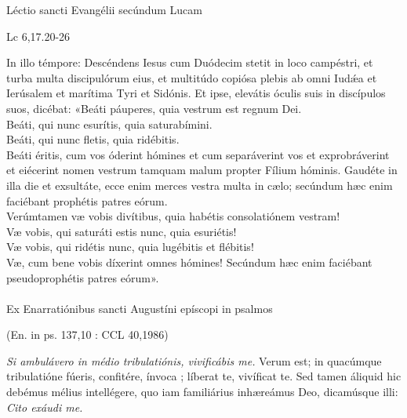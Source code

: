 \documentclass[options]{article}
\begin{document}
	Léctio sancti Evangélii secúndum Lucam 
	\begin{flushright}
		Lc 6,17.20-26
	\end{flushright}
In illo témpore:
Descéndens Iesus cum Duódecim stetit in loco campéstri, et turba multa discipulórum eius, et multitúdo copiósa plebis ab omni Iud\'{æ}a et Ierúsalem et marítima Tyri et Sidónis.
Et ipse, elevátis óculis suis in discípulos suos, dicébat:
«Beáti páuperes, quia vestrum est regnum Dei.\\
Beáti, qui nunc esurítis, quia saturabímini.\\
Beáti, qui nunc fletis, quia ridébitis.\\
Beáti éritis, cum vos óderint hómines et cum separáverint vos et exprobráverint et eiécerint nomen vestrum tamquam malum propter Fílium hóminis. Gaudéte in illa die et exsultáte, ecce enim merces vestra multa in cælo; secúndum hæc enim faciébant prophétis patres eórum.\\
Verúmtamen væ vobis divítibus, quia habétis consolatiónem vestram!\\
Væ vobis, qui saturáti estis nunc, quia esuriétis!\\
Væ vobis, qui ridétis nunc, quia lugébitis et flébitis!\\
Væ, cum bene vobis díxerint omnes hómines! Secúndum hæc enim faciébant pseudoprophétis patres eórum».\\
\\
Ex Enarratiónibus sancti Augustíni epíscopi in psalmos
\begin{flushright}
(En. in ps. 137,10 : CCL 40,1986)	
\end{flushright}
\emph{Si ambulávero in médio tribulatiónis, vivificábis me.} Verum est; in quacúmque tribulatióne fúeris, confitére, ínvoca ; líberat te, vivíficat te. Sed tamen áliquid hic debémus mélius intellégere, quo iam familiárius inhæreámus Deo, dicamúsque illi: \emph{Cito exáudi me.}\\
\end{document}
